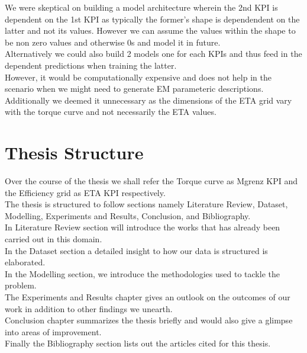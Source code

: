 \documentclass{report} %
\begin{document}
We were skeptical on building a model architecture wherein the 2nd KPI is dependent on the 1st KPI as typically the former's shape is dependendent on the latter and not its values.
However we can assume the values within the shape to be non zero values and otherwise 0s and model it in future.\\

Alternatively we could also build 2 models one for each KPIs and thus feed in the dependent predictions when training the latter. \\
However, it would be computationally expensive and does not help in the scenario when we might need to generate \ac{EM} parameteric descriptions.
Additionally we deemed it unnecessary as the dimensions of the ETA grid vary with the torque curve and not necessarily the ETA values. \\

\section{Thesis Structure}\label{sec:Thesis Structure}

Over the course of the thesis we shall refer the Torque curve as Mgrenz KPI and the Efficiency grid as ETA KPI respectively.\\
The thesis is structured to follow sections namely Literature Review, Dataset, Modelling, Experiments and Results, Conclusion, and Bibliography.\\
In Literature Review section will introduce the works that has already been carried out in this domain. \\
In the Dataset section a detailed insight to how our data is structured is elaborated.\\
In the Modelling section, we introduce the methodologies used to tackle the problem. \\
The Experiments and Results chapter gives an outlook on the outcomes of our work in addition to other findings we unearth.\\ 
Conclusion chapter summarizes the thesis briefly and would also give a glimpse into areas of improvement. \\
Finally the Bibliography section lists out the articles cited for this thesis.\\
\newpage 
\end{document}
